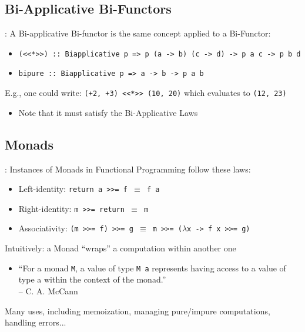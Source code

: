 \documentclass[logoontitle,tabu,supertabular,aspectratio=43]{preney-uwindsor-beamer}
\begin{document}
    \subsection{Bi-Applicative Bi-Functors}
    \begin{frame}{\insertsection: \insertsubsection}
            A Bi-applicative Bi-functor is the same concept applied to a Bi-Functor:
            \begin{itemize}
            \item \texttt{(<<*>>) :: Biapplicative p => p (a -> b) (c -> d) -> p a c -> p b d}
            \item \texttt{bipure :: Biapplicative p => a -> b -> p a b}
            \end{itemize}
            E.g., one could write: \texttt{(+2, +3) <<*>> (10, 20)} which evaluates to \texttt{(12, 23)}
            \begin{itemize}
                \item Note that it must satisfy the Bi-Applicative Laws
            \end{itemize}
    \end{frame}

    \subsection{Monads}
    \begin{frame}{\insertsection: \insertsubsection}
        Instances of Monads in Functional Programming follow these laws:
        \begin{itemize}
            \item Left-identity: \texttt{return a >>= f $\equiv$ f a}
            \item Right-identity: \texttt{m >>= return $\equiv$ m}
            \item Associativity: \texttt{(m >>= f) >>= g $\equiv$ m >>= ($\lambda$x -> f x >>= g)}
        \end{itemize}
        Intuitively: a Monad ``wraps'' a computation within another one
        \begin{itemize}
            \item ``For a monad \texttt{M}, a value of type \texttt{M a} represents having access to a value of type a within the context of the monad.'' \\ -- C. A. McCann
        \end{itemize}
        Many uses, including memoization, managing pure/impure computations, handling errors...
    \end{frame}


\end{document}
